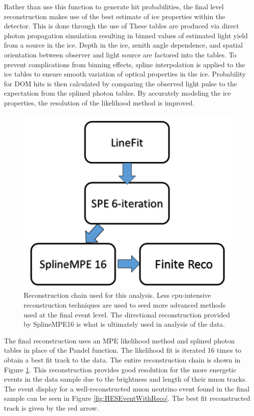 \documentclass{gatech-thesis}
\begin{document}
Rather than use this function to generate hit probabilities, the final level reconstruction makes use of the best estimate of ice properties within the detector. This is done through the use of These tables are produced via direct photon propagation simulation resulting in binned values of estimated light yield from a source in the ice. Depth in the ice, zenith angle dependence, and spatial orientation between observer and light source are factored into the tables. To prevent complications from binning effects, spline interpolation is applied to the ice tables to ensure smooth variation of optical properties in the ice. Probability for DOM hits is then calculated by comparing the observed light pulse to the expectation from the splined photon tables. By accurately modeling the ice properties, the resolution of the likelihood method is improved.
\begin{figure}[ht]
  \begin{center}
    \includegraphics[width=.45\textwidth,keepaspectratio]{RecoChain.png}
  \end{center}
  \caption[Reconstruction Chain]{Reconstruction chain used for this analysis. Less cpu-intensive reconstruction techniques are used to seed more advanced methods used at the final event level. The directional reconstruction provided by SplineMPE16 is what is ultimately used in analysis of the data.}
  \label{fig:recochain}
\end{figure}
The final reconstruction uses an MPE likelihood method and splined photon tables in place of the Pandel function. The likelihood fit is iterated 16 times to obtain a best fit track to the data. The entire reconstruction chain is shown in Figure \ref{fig:recochain}. This reconstruction provides good resolution for the more energetic events in the data sample due to the brightness and length of their muon tracks. The event display for a well-reconstructed muon neutrino event found in the final sample can be seen in Figure \ref{fig:HESEventWithReco}. The best fit reconstructed track is given by the red arrow.
\end{document}
